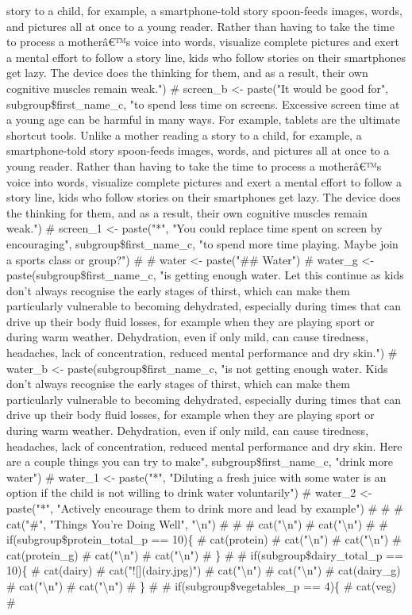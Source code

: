 \documentclass[]{article}
\newcommand{\euro}{€}
\begin{document}
story to a child, for example, a smartphone-told story spoon-feeds images, words, and pictures all at once to a young reader. Rather than having to take the time to process a motherâ\euro{}™s voice into words, visualize complete pictures and exert a mental effort to follow a story line, kids who follow stories on their smartphones get lazy. The device does the thinking for them, and as a result, their own cognitive muscles remain weak.") \# screen\_b \textless{}- paste("It would be good for", subgroup\$first\_name\_c, "to spend less time on screens. Excessive screen time at a young age can be harmful in many ways. For example, tablets are the ultimate shortcut tools. Unlike a mother reading a story to a child, for example, a smartphone-told story spoon-feeds images, words, and pictures all at once to a young reader. Rather than having to take the time to process a motherâ\euro{}™s voice into words, visualize complete pictures and exert a mental effort to follow a story line, kids who follow stories on their smartphones get lazy. The device does the thinking for them, and as a result, their own cognitive muscles remain weak.") \# screen\_1 \textless{}- paste("*", "You could replace time spent on screen by encouraging", subgroup\$first\_name\_c, "to spend more time playing. Maybe join a sports class or group?") \#  \# water \textless{}- paste("\#\# Water") \# water\_g \textless{}- paste(subgroup\$first\_name\_c, "is getting enough water. Let this continue as kids don't always recognise the early stages of thirst, which can make them particularly vulnerable to becoming dehydrated, especially during times that can drive up their body fluid losses, for example when they are playing sport or during warm weather. Dehydration, even if only mild, can cause tiredness, headaches, lack of concentration, reduced mental performance and dry skin.") \# water\_b \textless{}- paste(subgroup\$first\_name\_c, "is not getting enough water. Kids don't always recognise the early stages of thirst, which can make them particularly vulnerable to becoming dehydrated, especially during times that can drive up their body fluid losses, for example when they are playing sport or during warm weather. Dehydration, even if only mild, can cause tiredness, headaches, lack of concentration, reduced mental performance and dry skin.  Here are a couple things you can try to make", subgroup\$first\_name\_c, "drink more water") \# water\_1 \textless{}- paste("*", "Diluting a fresh juice with some water is an option if the child is not willing to drink water voluntarily") \# water\_2 \textless{}- paste("*", "Actively encourage them to drink more and lead by example") \#  \#    \# cat("\#", "Things You're Doing Well", "\textbackslash{}n") \#  \#  \# cat("\textbackslash{}n") \# cat("\textbackslash{}n") \#  \# if(subgroup\$protein\_total\_p == 10)\{ \#   cat(protein) \#   cat("\textbackslash{}n") \#   cat("\textbackslash{}n") \#   cat(protein\_g) \#   cat("\textbackslash{}n") \#   cat("\textbackslash{}n") \# \} \#  \# if(subgroup\$dairy\_total\_p == 10)\{ \#   cat(dairy) \#   cat("!{[}{]}(dairy.jpg)") \#   cat("\textbackslash{}n") \#   cat("\textbackslash{}n") \#   cat(dairy\_g) \#   cat("\textbackslash{}n") \#   cat("\textbackslash{}n") \# \} \#  \# if(subgroup\$vegetables\_p == 4)\{ \#   cat(veg) \#   
\end{document}
